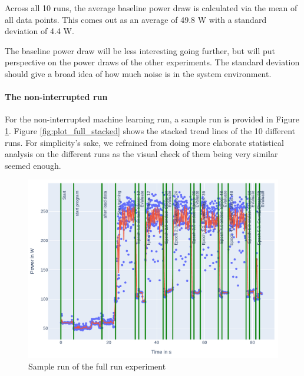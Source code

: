 Across all 10 runs, the average baseline power draw is calculated via the mean of all data points. This comes out as an average of 49.8 W with a standard deviation of 4.4 W.

The baseline power draw will be less interesting going further, but will put perspective on the power draws of the other experiments. The standard deviation should give a broad idea of how much noise is in the system environment.

\paragraph{The non-interrupted run}

For the non-interrupted machine learning run, a sample run is provided in Figure \ref{fig:plot_full}. 
Figure \ref{fig:plot_full_stacked} shows the stacked trend lines of the 10 different runs.
For simplicity's sake, we refrained from doing more elaborate statistical analysis on the different runs as the visual check of them being very similar seemed enough.

\begin{figure}
    \includegraphics[width=\linewidth]{power-measurements/measurements_roberta_full_0714010405/plot.pdf}
    \caption{Sample run of the full run experiment}
    \label{fig:plot_full}
\end{figure}

